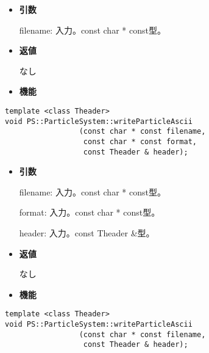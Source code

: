 \begin{itemize}

\item {\bf 引数}

filename: 入力。const char * const型。

\item {\bf 返値}

なし

\item {\bf 機能}


\end{itemize}

\label{sec:readParticleBinary}

\label{sec:writeParticleAscii}

\begin{screen}
\begin{verbatim}
template <class Theader>
void PS::ParticleSystem::writeParticleAscii
                 (const char * const filename,
                  const char * const format,
                  const Theader & header);
\end{verbatim}
\end{screen}

\begin{itemize}

\item {\bf 引数}

filename: 入力。const char * const型。

format: 入力。const char * const型。

header: 入力。const Theader \&型。

\item {\bf 返値}

なし

\item {\bf 機能}


\end{itemize}

\begin{screen}
\begin{verbatim}
template <class Theader>
void PS::ParticleSystem::writeParticleAscii
                 (const char * const filename,
                  const Theader & header);
\end{verbatim}
\end{screen}

